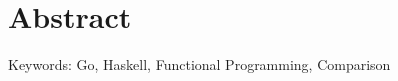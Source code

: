 \chapter*{Abstract}
\thispagestyle{empty}


\bigskip

\noindent
Keywords: Go, Haskell, Functional Programming, Comparison

